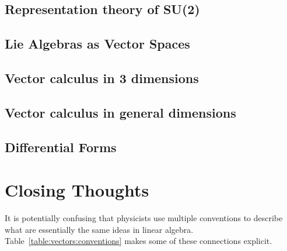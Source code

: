 \documentclass[12pt, oneside]{report}    %
\let\oldsection\section
\def\section{%
  \setcounter{sidenote}{1}%
  \oldsection
}
\begin{document}
\section{Representation theory of SU(2)}
\section{Lie Algebras as Vector Spaces}
\section{Vector calculus in 3 dimensions}
\section{Vector calculus in general dimensions}
\section{Differential Forms}


\chapter*{Closing Thoughts}


It is potentially confusing that physicists use multiple conventions to describe what are essentially the same ideas in linear algebra. Table~\ref{table:vectors:conventions} makes some of these connections explicit.
\end{document}
